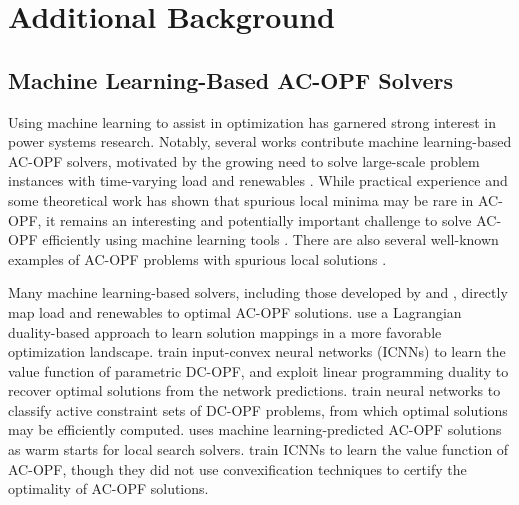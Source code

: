 \documentclass[10pt]{article} %
\theoremstyle{plain}
\theoremstyle{definition}
\theoremstyle{remark}
\begin{document}



\appendix

\section{Additional Background} \label{sec:additional_background}

\subsection{Machine Learning-Based AC-OPF Solvers}

Using machine learning to assist in optimization has garnered strong interest in power systems research. Notably, several works contribute machine learning-based AC-OPF solvers, motivated by the growing need to solve large-scale problem instances with time-varying load and renewables \citep{van2021machine, jiang2024advancements}. While practical experience and some theoretical work has shown that spurious local minima may be rare in AC-OPF, it remains an interesting and potentially important challenge to solve AC-OPF efficiently using machine learning tools \citep{zhou2021conditions}. There are also several well-known examples of AC-OPF problems with spurious local solutions \citep{bukhsh2013local}.

Many machine learning-based solvers, including those developed by \citet{pan2021deepopf} and \citet{singh2021learning}, directly map load and renewables to optimal AC-OPF solutions. \citet{zhang2022learning} use a Lagrangian duality-based approach to learn solution mappings in a more favorable optimization landscape. \citet{zhang2021convex} train input-convex neural networks (ICNNs) to learn the value function of parametric DC-OPF, and exploit linear programming duality to recover optimal solutions from the network predictions. \citet{deka2019learning} train neural networks to classify active constraint sets of DC-OPF problems, from which optimal solutions may be efficiently computed. \citet{baker2019learning} uses machine learning-predicted AC-OPF solutions as warm starts for local search solvers. \citet{rosemberg2024learning} train ICNNs to learn the value function of AC-OPF, though they did not use convexification techniques to certify the optimality of AC-OPF solutions.

\end{document}
